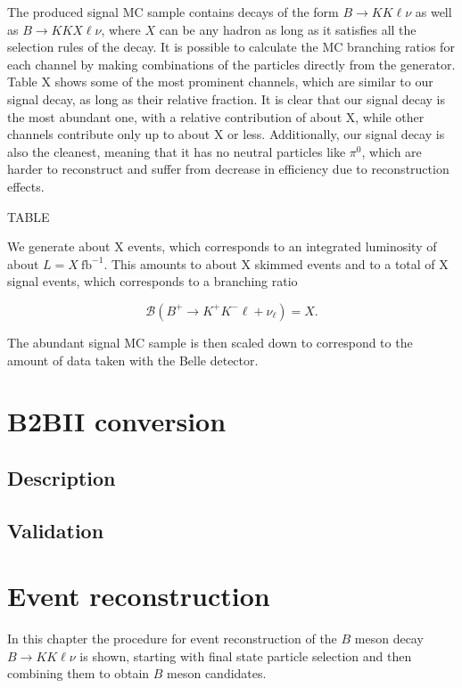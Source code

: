 \documentclass[  headings=standardclasses,
  headings=big,oneside,a4paper,openany,12pt]{scrbook}
\newcommand {\e}[1]{\mathrm{~#1}}
\begin{document}
The produced signal MC sample contains decays of the form $B \to KK\ell \nu$ as well as $B \to KKX\ell \nu$, where $X$ can be any hadron as long as it satisfies all the selection rules of the decay. It is possible to calculate the MC branching ratios for each channel by making combinations of the particles directly from the generator. Table X shows some of the most prominent channels, which are similar to our signal decay, as long as their relative fraction. It is clear that our signal decay is the most abundant one, with a relative contribution of about X, while other channels contribute only up to about X or less. Additionally, our signal decay is also the cleanest, meaning that it has no neutral particles like $\pi^0$, which are harder to reconstruct and suffer from decrease in efficiency due to reconstruction effects.

TABLE

We generate about X events, which corresponds to an integrated luminosity of about $L = X\e{fb^{-1}}$. This amounts to about X skimmed events and to a total of X signal events, which corresponds to a branching ratio

\begin{equation}
\mathcal{B}\left(B^+ \to K^+ K^- \ell+ \nu_\ell\right) = X.
\end{equation}

The abundant signal MC sample is then scaled down to correspond to the amount of data taken with the Belle detector.

\chapter{B2BII conversion}
\section{Description}
\section{Validation}

\chapter{Event reconstruction}

In this chapter the procedure for event reconstruction of the $B$ meson decay $B \to K K \ell \nu$ is shown, starting with final state particle selection and then combining them to obtain $B$ meson candidates. 
\end{document}
